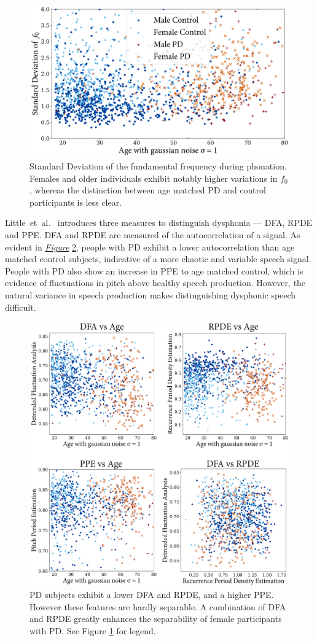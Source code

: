 \documentclass[12pt, twoside]{book}
\begin{document}
\begin{figure}[h]
	\label{stdevf0}
	\centering\includegraphics[width=0.75\linewidth]{f0stdev.png}
	\caption{Standard Deviation of the fundamental frequency during phonation. Females and older individuals exhibit notably higher variations in $f_0$, whereas the distinction between age matched PD and control participants is less clear.}
\end{figure}

Little~et~al.~\cite{splittlenonlinear2007,splittledysphonia2009} introduces three measures to distinguish dysphonia --- DFA, RPDE and PPE. DFA and RPDE are measured of the autocorrelation of a signal. As evident in \textit{\hyperref[dfapperpde]{Figure}} \ref{dfapperpde}, people with PD exhibit a lower autocorrelation than age matched control subjects, indicative of a more chaotic and variable speech signal. People with PD also show an increase in PPE to age matched control, which is evidence of fluctuations in pitch above healthy speech production. However, the natural variance in speech production makes distinguishing dysphonic speech difficult.


\begin{figure}[h]
	\label{dfapperpde}
	\centering\centerline{\includegraphics[width=0.8\linewidth]{dfapperpde.png}}
	\caption{PD subjects exhibit a lower DFA and RPDE, and a higher PPE. However these features are hardly separable. A combination of DFA and RPDE greatly enhances the separability of female participants with PD. See Figure \ref{stdevf0} for legend.}
\end{figure}
\end{document}
